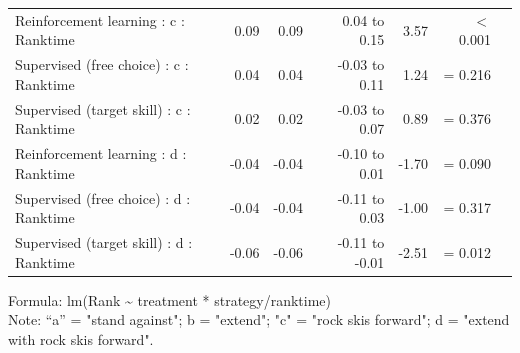 \documentclass[pdflatex,sn-mathphys-num]{sn-jnl}%
\theoremstyle{thmstyleone}%
\theoremstyle{thmstyletwo}%
\theoremstyle{thmstylethree}%
\begin{document}
\begin{appendices}
\begin{longtable}{lrrrrrl}
Reinforcement learning : c : Ranktime & 0.09 & 0.09 & 0.04 to 0.15 & 3.57 &  $<$  0.001 \\ 
Supervised (free choice) : c : Ranktime & 0.04 & 0.04 & -0.03 to 0.11 & 1.24 &  =  0.216 \\ 
Supervised (target skill) : c : Ranktime & 0.02 & 0.02 & -0.03 to 0.07 & 0.89 &  =  0.376 \\ 
Reinforcement learning : d : Ranktime & -0.04 & -0.04 & -0.10 to 0.01 & -1.70 &  =  0.090 \\ 
Supervised (free choice) : d : Ranktime & -0.04 & -0.04 & -0.11 to 0.03 & -1.00 &  =  0.317 \\ 
Supervised (target skill) : d : Ranktime & -0.06 & -0.06 & -0.11 to -0.01 & -2.51 &  =  0.012 \\ 
\bottomrule
\end{longtable}
\begin{minipage}{\linewidth}
Formula: lm(Rank \textasciitilde{} treatment * strategy/ranktime)\\
Note: “a” = "stand against"; b = "extend"; "c" = "rock skis forward"; d = "extend with rock skis forward". 
\end{minipage}


\end{appendices}
\end{document}
